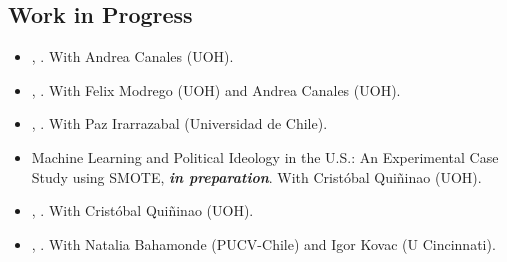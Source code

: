 \subsection*{Work in Progress}


\begin{itemize}

  	\item[\textcolor{gray}{\textbullet}] \href{https://raw.githubusercontent.com/hbahamonde/Economic_Experiment_Vote_Selling/master/abstract.txt}{\unskip}, {\bf \emph{\unskip}}. With Andrea Canales (UOH).

	\item[\textcolor{gray}{\textbullet}] \href{https://raw.githubusercontent.com/hbahamonde/Bus/master/abstract.txt}{\unskip}, {\bf \emph{\unskip}}. With Felix Modrego (UOH) and Andrea Canales (UOH).

	\item[\textcolor{gray}{\textbullet}] \href{https://raw.githubusercontent.com/hbahamonde/Tobalaba/master/abstract.txt}{\unskip}, {\bf \emph{\unskip}}. With Paz Irarrazabal (Universidad de Chile).

	\item[\textcolor{gray}{\textbullet}] Machine Learning and Political Ideology in the U.S.: An Experimental Case Study using SMOTE, {\bf \emph{in preparation}}. With Crist\'obal Qui\~ninao (UOH).

	\item[\textcolor{gray}{\textbullet}] \href{https://github.com/hbahamonde/Conjoint_US/raw/master/Bahamonde_Quininao_Conjoint.pdf}{\unskip}, {\bf \emph{\unskip}}. With Crist\'obal Qui\~ninao (UOH).

	\item[\textcolor{gray}{\textbullet}] \href{https://www.hectorbahamonde.com}{\unskip}, {\bf \emph{\unskip}}. With Natalia Bahamonde (PUCV-Chile) and Igor Kovac (U Cincinnati).



\end{itemize}
